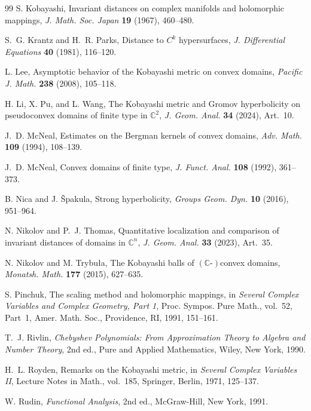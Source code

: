 \documentclass[11pt]{article}
\theoremstyle{definition}
\newcommand{\C}{\mathbb{C}}
\begin{document}
\begin{thebibliography}{99}
	S. Kobayashi,
	Invariant distances on complex manifolds and holomorphic mappings,
	\emph{J. Math. Soc. Japan} \textbf{19} (1967), 460--480.
	
	S.~G. Krantz and H.~R. Parks,
	Distance to \(C^k\) hypersurfaces,
	\emph{J. Differential Equations} \textbf{40} (1981), 116--120.
	
	L. Lee,
	Asymptotic behavior of the Kobayashi metric on convex domains,
	\emph{Pacific J. Math.} \textbf{238} (2008), 105--118.
	
	H. Li, X. Pu, and L. Wang,
	The Kobayashi metric and Gromov hyperbolicity on pseudoconvex domains
	of finite type in \(\C^2\),
	\emph{J. Geom. Anal.} \textbf{34} (2024), Art.~10.
	
	J.~D. McNeal,
	Estimates on the Bergman kernels of convex domains,
	\emph{Adv. Math.} \textbf{109} (1994), 108--139.
	
	J.~D. McNeal,
	Convex domains of finite type,
	\emph{J. Funct. Anal.} \textbf{108} (1992), 361--373.
	
	B. Nica and J. \v{S}pakula,
	Strong hyperbolicity,
	\emph{Groups Geom. Dyn.} \textbf{10} (2016), 951--964.
	
	N. Nikolov and P.~J. Thomas,
	Quantitative localization and comparison of invariant distances of
	domains in \(\C^n\),
	\emph{J. Geom. Anal.} \textbf{33} (2023), Art.~35.
	
	N. Nikolov and M. Trybu{\l}a,
	The Kobayashi balls of \((\C\text{-})\)convex domains,
	\emph{Monatsh. Math.} \textbf{177} (2015), 627--635.
	
	S. Pinchuk,
	The scaling method and holomorphic mappings,
	in \emph{Several Complex Variables and Complex Geometry, Part 1},
	Proc. Sympos. Pure Math., vol.~52, Part~1,
	Amer. Math. Soc., Providence, RI, 1991, 151--161.
	
	T.~J. Rivlin,
	\emph{Chebyshev Polynomials: From Approximation Theory to Algebra and
		Number Theory},
	2nd ed., Pure and Applied Mathematics,
	Wiley, New York, 1990.
	
	H.~L. Royden,
	Remarks on the Kobayashi metric,
	in \emph{Several Complex Variables II},
	Lecture Notes in Math., vol.~185,
	Springer, Berlin, 1971, 125--137.
	
	W. Rudin,
	\emph{Functional Analysis},
	2nd ed.,
	McGraw-Hill, New York, 1991.
	

\end{thebibliography}
\end{document}
